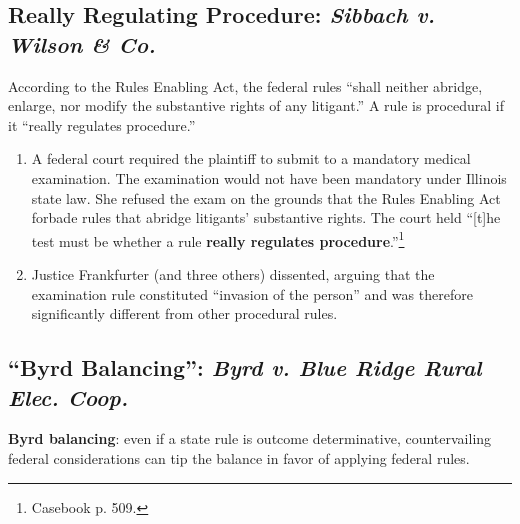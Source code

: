 \subsection{Really Regulating Procedure: \emph{Sibbach v. Wilson \& 
Co.}}

According to the Rules Enabling Act, the federal rules ``shall neither 
abridge, enlarge, nor modify the substantive rights of any litigant.'' A rule 
is procedural if it ``really regulates procedure.''

\begin{enumerate}
    \item A federal court required the plaintiff to submit to a mandatory medical 
    examination. The examination would not have been mandatory under Illinois 
    state law. She refused the exam on the grounds that the Rules Enabling Act 
    forbade rules that abridge litigants' substantive rights. The court held 
    ``[t]he test must be whether a rule \textbf{really regulates 
    procedure}.''\footnote{Casebook p. 509.}
    \item Justice Frankfurter (and three others) dissented, arguing that the 
    examination rule constituted ``invasion of the person'' and was therefore 
    significantly different from other procedural rules.
\end{enumerate}

\subsection{``Byrd Balancing'': \emph{Byrd v. Blue Ridge Rural Elec. Coop.}}

\textbf{Byrd balancing}: even if a state rule is outcome determinative, 
countervailing federal considerations can tip the balance in favor of applying 
federal rules.

